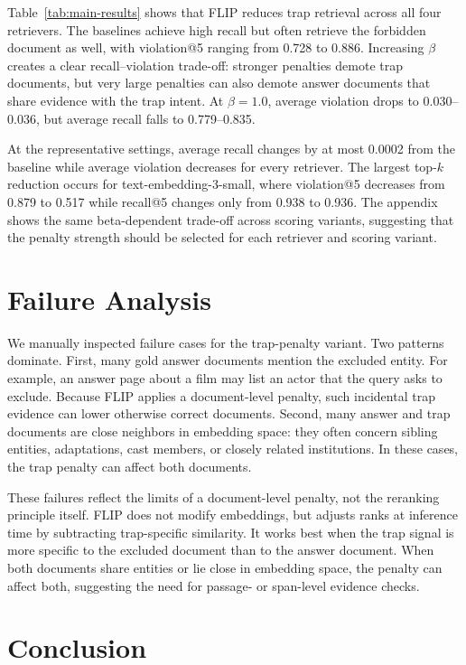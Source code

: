 \documentclass[11pt]{article}
\newcommand{\method}{FLIP\xspace}
\begin{document}
Table~\ref{tab:main-results} shows that \method reduces trap retrieval across all four retrievers.
The baselines achieve high recall but often retrieve the forbidden document as well, with violation@5 ranging from 0.728 to 0.886.
Increasing $\beta$ creates a clear recall--violation trade-off: stronger penalties demote trap documents, but very large penalties can also demote answer documents that share evidence with the trap intent.
At $\beta=1.0$, average violation drops to 0.030--0.036, but average recall falls to 0.779--0.835.

At the representative settings, average recall changes by at most 0.0002 from the baseline while average violation decreases for every retriever.
The largest top-$k$ reduction occurs for text-embedding-3-small, where violation@5 decreases from 0.879 to 0.517 while recall@5 changes only from 0.938 to 0.936.
The appendix shows the same beta-dependent trade-off across scoring variants, suggesting that the penalty strength should be selected for each retriever and scoring variant.

\section{Failure Analysis}

We manually inspected failure cases for the trap-penalty variant.
Two patterns dominate.
First, many gold answer documents mention the excluded entity.
For example, an answer page about a film may list an actor that the query asks to exclude.
Because \method applies a document-level penalty, such incidental trap evidence can lower otherwise correct documents.
Second, many answer and trap documents are close neighbors in embedding space: they often concern sibling entities, adaptations, cast members, or closely related institutions.
In these cases, the trap penalty can affect both documents.

These failures reflect the limits of a document-level penalty, not the reranking principle itself.
\method does not modify embeddings, but adjusts ranks at inference time by subtracting trap-specific similarity.
It works best when the trap signal is more specific to the excluded document than to the answer document.
When both documents share entities or lie close in embedding space, the penalty can affect both, suggesting the need for passage- or span-level evidence checks.

\section{Conclusion}
\end{document}
